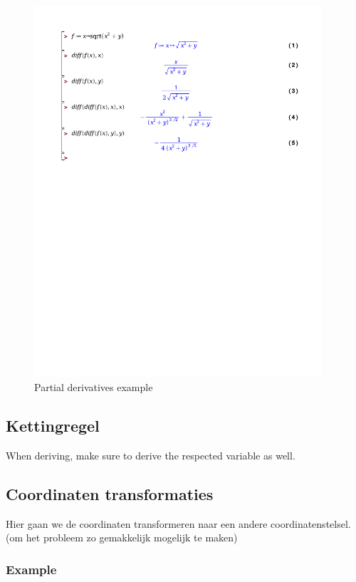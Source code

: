 \documentclass[a4paper]{report}
\begin{document}
\begin{figure}[H]
	\begin{center}
		\includegraphics[width=0.95\textwidth]{./partial_2.pdf}
	\end{center}
	\caption{Partial derivatives example}
	\label{}
\end{figure}

\subsection{Kettingregel}

When deriving, make sure to derive the respected variable as well.

\subsection{Coordinaten transformaties}

Hier gaan we de coordinaten transformeren naar een andere coordinatenstelsel. (om het probleem zo gemakkelijk mogelijk te maken)

\subsubsection{Example}
\end{document}
